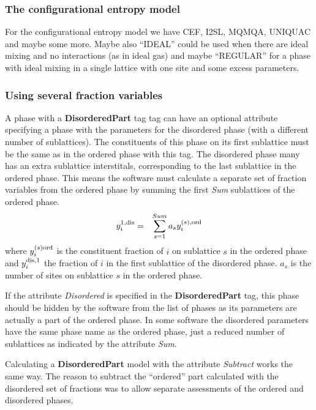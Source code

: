 \documentclass{article}
\begin{document}
\subsubsection{The configurational entropy model}\label{sec:cfg}

For the configurational entropy model we have CEF, I2SL, MQMQA,
UNIQUAC and maybe some more.  Maybe also ``IDEAL'' could be used when
there are ideal mixing and no interactions (as in ideal gas) and maybe
``REGULAR'' for a phase with ideal mixing in a single lattice with one
site and some excess parameters.

\subsubsection{Using several fraction variables}\label{sec:nodis}

A phase with a {\bf DisorderedPart} tag tag can have an optional
attribute specifying a phase with the parameters for the disordered
phase (with a different number of sublattices). The constituents of
this phase on its first sublattice must be the same as in the ordered
phase with this tag.  The disordered phase many has an extra
sublattice interstitals, corresponding to the last sublattice in the
ordered phase.  This means the software must calculate a separate set
of fraction variables from the ordered phase by summing the first {\em
  Sum} sublattices of the ordered phase.
\begin{eqnarray}
y^{1,\rm dis}_i &=& \sum^{Sum}_{s=1} a_s y^{(s),\rm ord}_i
\end{eqnarray}
where $y^{(s)\rm ord}_i$ is the constituent fraction of $i$ on
sublattice $s$ in the ordered phase and $y^{\rm dis,1}_i$ the fraction
of $i$ in the first sublattice of the disordered phase.  $a_s$ is the
number of sites on sublattice $s$ in the ordered phase.

If the attribute {\em Disordered} is specified in the {\bf
  DisorderedPart} tag, this phase should be hidden by the software
from the list of phases as its parameters are actually a part of the
ordered phase.  In some software the disordered parameters have the
same phase name as the ordered phase, just a reduced number of
sublattices as indicated by the attribute {\em Sum}.

Calculating a {\bf DisorderedPart} model with the attribute {\em
  Subtract} works the same way.  The reason to subtract the
``ordered'' part calculated with the disordered set of fractions was
to allow separate assessments of the ordered and disordered phases.
\end{document}

